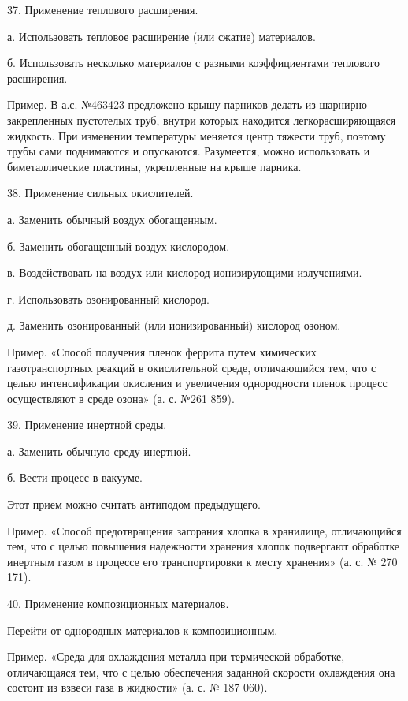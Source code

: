 37. Применение теплового расширения.

а. Использовать тепловое расширение (или сжатие) материалов.

б.   Использовать  несколько   материалов  с   разными  коэффициентами
теплового расширения.

Пример.   В  а.с.   №463423  предложено   крышу  парников   делать  из
шарнирно-закрепленных  пустотелых   труб,  внутри   которых  находится
легкорасширяющаяся жидкость. При  изменении температуры меняется центр
тяжести труб, поэтому трубы сами поднимаются и опускаются. Разумеется,
можно использовать  и биметаллические  пластины, укрепленные  на крыше
парника.

38. Применение сильных окислителей.

а. Заменить обычный воздух обогащенным.

б. Заменить обогащенный воздух  кислородом.

в. Воздействовать на воздух или кислород ионизирующими излучениями.

г. Использовать озонированный кислород.

д. Заменить озонированный (или ионизированный) кислород озоном.

Пример.   «Способ   получения    пленок   феррита   путем   химических
газотранспортных реакций в окислительной  среде, отличающийся тем, что
с  целью интенсификации  окисления  и  увеличения однородности  пленок
процесс осуществляют в среде озона» (а. с. №261 859).

39. Применение инертной среды.

а. Заменить обычную среду инертной.

б. Вести процесс в вакууме.

Этот прием можно считать антиподом предыдущего.

Пример.   «Способ  предотвращения   загорания   хлопка  в   хранилище,
отличающийся  тем, что  с целью  повышения надежности  хранения хлопок
подвергают обработке  инертным газом в процессе  его транспортировки к
месту хранения» (а. с. № 270 171).

40. Применение композиционных материалов.

Перейти от однородных материалов к композиционным.

Пример.  «Среда  для  охлаждения металла  при  термической  обработке,
отличающаяся тем, что с целью обеспечения заданной скорости охлаждения
она состоит из взвеси газа в жидкости» (а. с. № 187 060).




